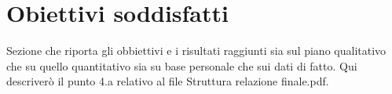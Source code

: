 \section{Obiettivi soddisfatti}

Sezione che riporta gli obbiettivi e i risultati raggiunti sia sul piano qualitativo che su quello quantitativo sia su base personale che sui dati di fatto.
Qui descriverò il punto 4.a relativo al file Struttura relazione finale.pdf.


